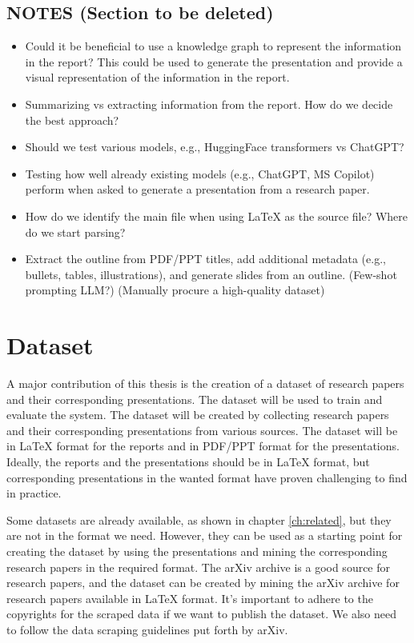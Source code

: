 %
\subsection{NOTES (Section to be deleted)}
\begin{itemize}
    \item Could it be beneficial to use a knowledge graph to represent the information in the report? This could be used to generate the presentation and provide a visual representation of the information in the report.
    \item Summarizing vs extracting information from the report. How do we decide the best approach?
    \item Should we test various models, e.g., HuggingFace transformers vs ChatGPT?
    \item Testing how well already existing models (e.g., ChatGPT, MS Copilot) perform when asked to generate a presentation from a research paper.
    \item How do we identify the main file when using LaTeX as the source file? Where do we start parsing? 
    \item Extract the outline from PDF/PPT titles, add additional metadata (e.g., bullets, tables, illustrations), and generate slides from an outline. (Few-shot prompting LLM?) (Manually procure a high-quality dataset)
\end{itemize}

\section{Dataset}

A major contribution of this thesis is the creation of a dataset of research papers and their corresponding presentations. The dataset will be used to train and evaluate the system. The dataset will be created by collecting research papers and their corresponding presentations from various sources. The dataset will be in \LaTeX{} format for the reports and in PDF/PPT format for the presentations. Ideally, the reports and the presentations should be in LaTeX format, but corresponding presentations in the wanted format have proven challenging to find in practice. 

Some datasets are already available, as shown in chapter \ref{ch:related}, but they are not in the format we need. However, they can be used as a starting point for creating the dataset by using the presentations and mining the corresponding research papers in the required format. The arXiv archive is a good source for research papers, and the dataset can be created by mining the arXiv archive for research papers available in \LaTeX{} format. It's important to adhere to the copyrights for the scraped data if we want to publish the dataset. We also need to follow the data scraping guidelines put forth by arXiv.

